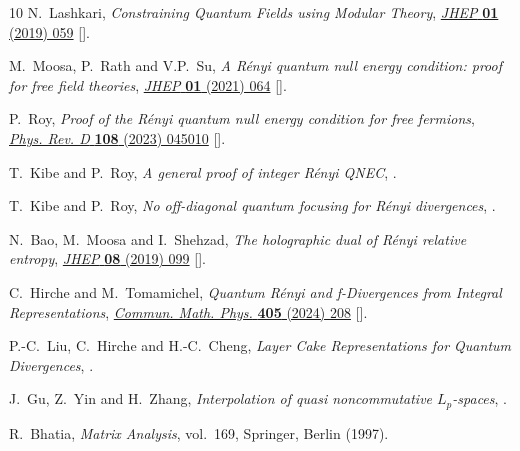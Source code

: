 \documentclass[12pt]{article}
\numberwithin{equation}{section}
\theoremstyle{definition}
\theoremstyle{remark}
\newcommand{\?}{\overset{?}{=}}
\begin{document}
\begin{thebibliography}{10}
N.~Lashkari, \emph{{Constraining Quantum Fields using Modular Theory}},
  \href{https://doi.org/10.1007/JHEP01(2019)059}{\emph{JHEP} {\bfseries 01}
  (2019) 059} [\href{https://arxiv.org/abs/1810.09306}{{}}].

M.~Moosa, P.~Rath and V.P.~Su, \emph{{A R\'enyi quantum null energy condition:
  proof for free field theories}},
  \href{https://doi.org/10.1007/JHEP01(2021)064}{\emph{JHEP} {\bfseries 01}
  (2021) 064} [\href{https://arxiv.org/abs/2007.15025}{{}}].

P.~Roy, \emph{{Proof of the R\'enyi quantum null energy condition for free
  fermions}}, \href{https://doi.org/10.1103/PhysRevD.108.045010}{\emph{Phys.
  Rev. D} {\bfseries 108} (2023) 045010}
  [\href{https://arxiv.org/abs/2212.02331}{{}}].

T.~Kibe and P.~Roy, \emph{{A general proof of integer R{\'e}nyi QNEC}},
  \href{https://arxiv.org/abs/2605.15272}{{}}.

T.~Kibe and P.~Roy, \emph{{No off-diagonal quantum focusing for R{\'e}nyi
  divergences}},  \href{https://arxiv.org/abs/2607.07799}{{}}.

N.~Bao, M.~Moosa and I.~Shehzad, \emph{{The holographic dual of R\'enyi
  relative entropy}},
  \href{https://doi.org/10.1007/JHEP08(2019)099}{\emph{JHEP} {\bfseries 08}
  (2019) 099} [\href{https://arxiv.org/abs/1904.08433}{{}}].

C.~Hirche and M.~Tomamichel, \emph{{Quantum R{\'e}nyi and f-Divergences from
  Integral Representations}},
  \href{https://doi.org/10.1007/s00220-024-05087-3}{\emph{Commun. Math. Phys.}
  {\bfseries 405} (2024) 208}
  [\href{https://arxiv.org/abs/2306.12343}{{}}].

P.-C.~Liu, C.~Hirche and H.-C.~Cheng, \emph{{Layer Cake Representations for
  Quantum Divergences}},  \href{https://arxiv.org/abs/2507.07065}{{}}.

J.~Gu, Z.~Yin and H.~Zhang, \emph{{Interpolation of quasi noncommutative
  $L_p$-spaces}},  \href{https://arxiv.org/abs/1905.08491}{{}}.

R.~Bhatia, \emph{Matrix Analysis}, vol.~169, Springer, Berlin (1997).


\end{thebibliography}
\end{document}
